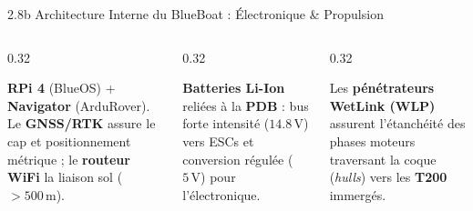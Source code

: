 \begin{frame}{2.8b Architecture Interne du BlueBoat : Électronique \& Propulsion}
  \vspace{0.1em}
  \begin{columns}[T, onlytextwidth]
    \begin{column}{0.32\textwidth}
      \begin{block}{}
        \scriptsize
        \textbf{RPi 4} (BlueOS) + \textbf{Navigator} (ArduRover). Le \textbf{GNSS/RTK} assure le cap et positionnement métrique ; le \textbf{routeur WiFi} la liaison sol ($>500\,\text{m}$).
      \end{block}
    \end{column}

    \begin{column}{0.32\textwidth}
      \begin{block}{}
        \scriptsize
        \textbf{Batteries Li-Ion} reliées à la \textbf{PDB} : bus forte intensité ($14.8\,\text{V}$) vers ESCs et conversion régulée ($5\,\text{V}$) pour l'électronique.
      \end{block}
    \end{column}

    \begin{column}{0.32\textwidth}
      \begin{block}{}
        \scriptsize
        Les \textbf{pénétrateurs WetLink (WLP)} assurent l'étanchéité des phases moteurs traversant la coque (\textit{hulls}) vers les \textbf{T200} immergés.
      \end{block}
    \end{column}
  \end{columns}
\end{frame}

